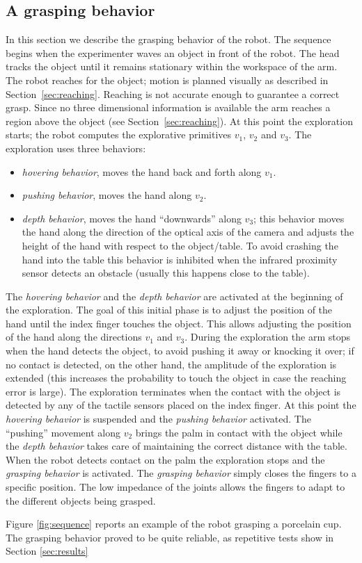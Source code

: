 \subsection{A grasping behavior}
In this section we describe the grasping behavior of the robot.
The sequence begins when the experimenter waves an object in front
of the robot. The head tracks the object until it remains
stationary within the workspace of the arm. The robot reaches for
the object; motion is planned visually as described in
Section~\ref{sec:reaching}. Reaching is not accurate enough to
guarantee a correct grasp. Since no three dimensional information
is available the arm reaches a region above the object (see
Section~\ref{sec:reaching}). At this point the exploration starts;
the robot computes the explorative primitives $v_1$, $v_2$ and
$v_3$. The exploration uses three behaviors: 
%
\begin{itemize}
\item \emph{hovering behavior}, moves the hand back and forth along 
$v_1$.
%
\item \emph{pushing behavior}, moves the hand
along $v_2$.
%
\item \emph{depth behavior}, moves the hand ``downwards''
along $v_3$; this behavior moves the hand along the direction of
the optical axis of the camera and adjusts the height of the hand
with respect to the object/table. To avoid crashing the hand into
the table this behavior is inhibited when the infrared proximity
sensor detects an obstacle (usually this happens close to the
table).
%
\end{itemize}
%
The \emph{hovering behavior} and the \emph{depth behavior} are
activated at the beginning of the exploration. The goal of this
initial phase is to adjust the position of the hand until the
index finger touches the object. This allows adjusting the
position of the hand along the directions $v_1$ and $v_3$. During
the exploration the arm stops when the hand detects the object, to
avoid pushing it away or knocking it over; if no contact is
detected, on the other hand, the amplitude of the exploration is
extended (this increases the probability to touch the object in
case the reaching error is large). The exploration terminates when
the contact with the object is detected by any of the tactile
sensors placed on the index finger. At this point the \emph{hovering
behavior} is suspended and the \emph{pushing behavior} activated. The
``pushing'' movement along $v_2$ brings the palm in contact with
the object while the \emph{depth behavior} takes care of
maintaining the correct distance with the table. When the robot
detects contact on the palm the exploration stops and the
\emph{grasping behavior} is activated. The \emph{grasping
behavior} simply closes the fingers to a specific position. The
low impedance of the joints allows the fingers to adapt to the
different objects being grasped.

Figure \ref{fig:sequence} reports an example of the robot grasping 
a porcelain cup. The grasping behavior proved to be quite reliable, as 
repetitive tests show in Section \ref{sec:results}